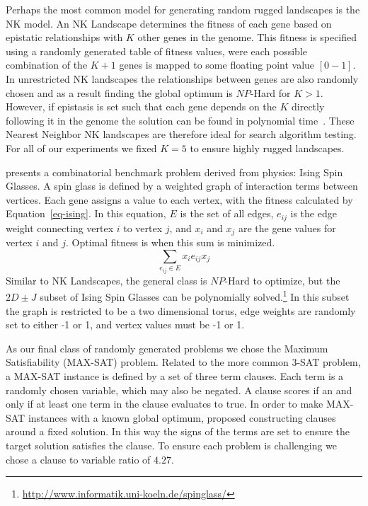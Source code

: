 Perhaps the most common model for generating random rugged landscapes is the NK model. An
NK Landscape determines the fitness of each gene based on epistatic relationships with $K$
other genes in the genome. This fitness is specified using a randomly generated table of
fitness values, were each possible combination of the $K+1$ genes is mapped to some floating
point value $[0-1]$. In unrestricted NK landscapes the relationships between genes are also
randomly chosen and as a result finding the global optimum is $NP$-Hard for $K>1$. However,
if epistasis is set such that each gene depends on the $K$ directly following it
in the genome the solution can be found in polynomial time~\citep{wright:2000:solvingnk}.
These Nearest Neighbor NK landscapes are therefore ideal for search algorithm testing.
For all of our experiments we fixed $K=5$ to ensure highly rugged landscapes.

\cite{saul:1994:spinglass} presents a combinatorial benchmark problem derived from physics:
Ising Spin Glasses. A spin glass is defined by a weighted graph of interaction terms between vertices.
Each gene assigns a value to each vertex, with the fitness calculated by Equation~\ref{eq-ising}.
In this equation, $E$ is the set of all edges, $e_{ij}$ is the edge weight connecting vertex $i$ to vertex $j$, and
$x_i$ and $x_j$ are the gene values for vertex $i$ and $j$. Optimal fitness is when this sum is minimized.
\begin{equation}
\sum_{e_{ij} \in E} x_ie_{ij}x_j
  \label{eq-ising}
\end{equation}
Similar to NK Landscapes, the general class is $NP$-Hard to optimize, but the $2D\pm J$ subset of
Ising Spin Glasses can be polynomially solved.\footnote{\url{http://www.informatik.uni-koeln.de/spinglass/}}
In this subset the graph is restricted to be a two dimensional torus, edge weights are randomly set
to either -1 or 1, and vertex values must be -1 or 1.

As our final class of randomly generated problems we chose the Maximum Satisfiability (MAX-SAT) problem.
Related to the more common 3-SAT problem, a MAX-SAT instance is defined by a set of three term clauses.
Each term is a randomly chosen variable, which may also be negated. A clause scores if an and only if
at least one term in the clause evaluates to true. In order to make MAX-SAT instances with a known global
optimum, \cite{goldman:2014:p3} proposed constructing clauses around a fixed solution. In this way the
signs of the terms are set to ensure the target solution satisfies the clause. To ensure each
problem is challenging we chose a clause to variable ratio of $4.27$.


